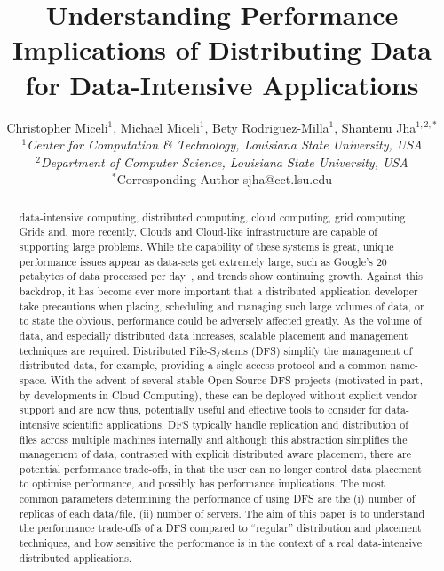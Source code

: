 \documentclass{rspublic}
\title[Understanding Performance Implications of Distributing Data for
  Data-Intensive Applications]{Understanding Performance Implications
  of Distributing Data for Data-Intensive Applications}
\author[Miceli, Miceli, Rodriguez-Milla, Jha]{ Christopher Miceli$^{1}$,
Michael Miceli$^{1}$, Bety Rodriguez-Milla$^{1}$, Shantenu Jha$^{1,2,*}$ \\
\small{\emph{$^{1}$Center for Computation \& Technology, Louisiana State
University, USA}} \\  \small{\emph{$^{2}$Department of Computer Science,
Louisiana State University, USA}} \\ {\footnotesize {\hspace{0.0 in}
$^*$Corresponding Author sjha@cct.lsu.edu}} }
\newcommand{\micnote}[1]{} \newcommand{\fixme}[1]{} \fi
\begin{document}
 

\maketitle

\micnote{This can't be more than 200 words. The summary should be
concise and informative. It should be complete by itself, and must not
contain references or unexplained abbreviations. It should not only
indicate the general scope of the article but also state the main
results and conclusions. Please note that footnotes are not used.}

\begin{abstract}{data-intensive computing, distributed computing, cloud
computing, grid computing} Grids and, more recently, Clouds and
Cloud-like infrastructure are capable of supporting large problems.
While the capability of these systems is great, unique performance
issues appear as data-sets get extremely large, such as Google's 20
petabytes of data processed per day~\citep{google}, and trends show
continuing growth. Against this backdrop, it has become ever more
important that a distributed application developer take precautions when
placing, scheduling and managing such large volumes of data, or to state
the obvious, performance could be adversely affected greatly. As the
volume of data, and especially distributed data increases, scalable
placement and management techniques are required.  Distributed
File-Systems (DFS) simplify the management of distributed data, for
example, providing a single access protocol and a common name-space.
With the advent of several stable Open Source DFS projects (motivated in
part, by developments in Cloud Computing), these can be deployed without
explicit vendor support and are now thus, potentially useful and
effective tools to consider for data-intensive scientific applications.
DFS typically handle replication and distribution of files across
multiple machines internally and although this abstraction simplifies
the management of data, contrasted with explicit distributed aware
placement, there are potential performance trade-offs, in that the user
can no longer control data placement to optimise performance, and
possibly has performance implications.  The most common parameters
determining the performance of using DFS are the (i) number of replicas
of each data/file, (ii) number of servers. The aim of this paper is to
understand the performance trade-offs of a DFS compared to ``regular''
distribution and placement techniques, and how sensitive the performance
is in the context of a real data-intensive distributed
applications.\end{abstract}
\end{document}
